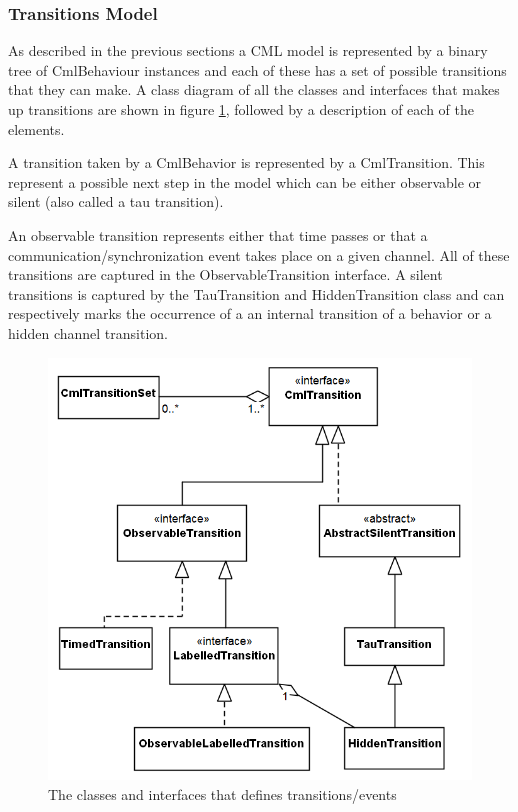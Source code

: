 \documentclass[a4paper, 10pt]{include/compassreport}   %
\begin{document}
\subsubsection{Transitions Model}
\label{sec:transition_model}

As described in the previous sections a CML model is represented by a
binary tree of CmlBehaviour instances and each of these has a set of
possible transitions that they can make. A class diagram of all the
classes and interfaces that makes up transitions are shown in figure
\ref{fig:events}, followed by a description of each of the elements.

A transition taken by a CmlBehavior is represented by a
CmlTransition. This represent a possible next step in the model which
can be either observable or silent (also called a tau transition).

An observable transition represents either that time passes or that a
communication/synchronization event takes place on a given
channel. All of these transitions are captured in the
ObservableTransition interface.  A silent transitions is captured by
the TauTransition and HiddenTransition class and can respectively
marks the occurrence of a an internal transition of a behavior or a
hidden channel transition.

\begin{figure}[ht!]
  \begin{center}
    \includegraphics[width=1\textwidth]{figures/Events}
    \caption{The classes and interfaces that defines transitions/events}
    \label{fig:events}
  \end{center}
\end{figure}
\end{document}
